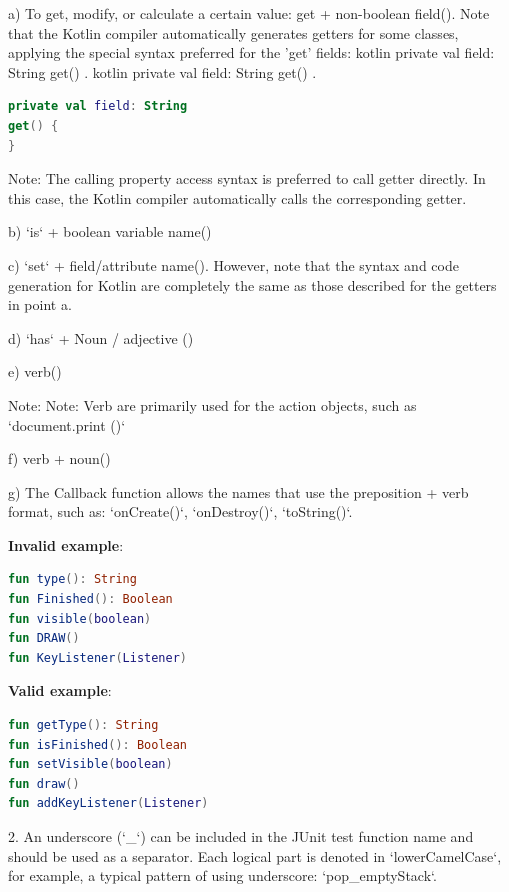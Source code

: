 a) To get, modify, or calculate a certain value: get + non-boolean field(). Note that the Kotlin compiler automatically generates getters for some classes, applying the special syntax preferred for the 'get' fields: kotlin private val field: String get() { }. kotlin private val field: String get() { }.

\begin{lstlisting}[language=Kotlin]
private val field: String
get() {
}
\end{lstlisting}
Note: The calling property access syntax is preferred to call getter directly. In this case, the Kotlin compiler automatically calls the corresponding getter.



b) `is` + boolean variable name()



c) `set` + field/attribute name(). However, note that the syntax and code generation for Kotlin are completely the same as those described for the getters in point a.



d) `has` + Noun / adjective ()



e) verb()

Note: Note: Verb are primarily used for the action objects, such as `document.print ()`



f) verb + noun() 



g) The Callback function allows the names that use the preposition + verb format, such as: `onCreate()`, `onDestroy()`, `toString()`.



\textbf{Invalid example}: 



\begin{lstlisting}[language=Kotlin]
fun type(): String
fun Finished(): Boolean
fun visible(boolean)
fun DRAW()
fun KeyListener(Listener)
\end{lstlisting}


\textbf{Valid example}: 



\begin{lstlisting}[language=Kotlin]
fun getType(): String
fun isFinished(): Boolean
fun setVisible(boolean)
fun draw()
fun addKeyListener(Listener)
\end{lstlisting}


2.	An underscore (`_`) can be included in the JUnit test function name and should be used as a separator. Each logical part is denoted in `lowerCamelCase`, for example, a typical pattern of using underscore: `pop_emptyStack`.


